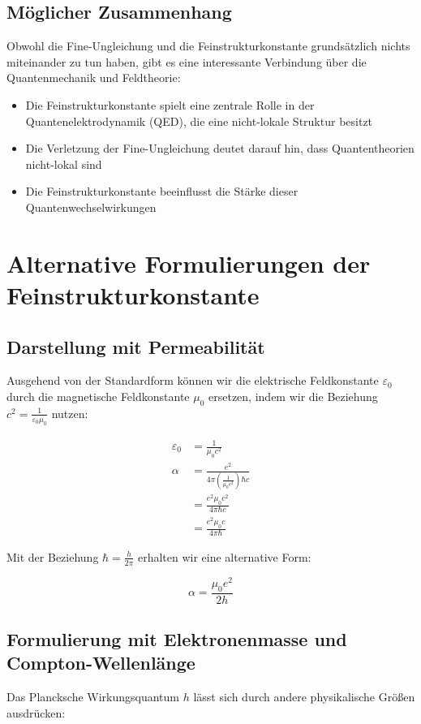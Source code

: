 \documentclass{article}
\begin{document}
	\subsection{Möglicher Zusammenhang}
	Obwohl die Fine-Ungleichung und die Feinstrukturkonstante grundsätzlich nichts miteinander zu tun haben, gibt es eine interessante Verbindung über die Quantenmechanik und Feldtheorie:
	
	\begin{itemize}
		\item Die Feinstrukturkonstante spielt eine zentrale Rolle in der Quantenelektrodynamik (QED), die eine nicht-lokale Struktur besitzt
		\item Die Verletzung der Fine-Ungleichung deutet darauf hin, dass Quantentheorien nicht-lokal sind
		\item Die Feinstrukturkonstante beeinflusst die Stärke dieser Quantenwechselwirkungen
	\end{itemize}
	
	\section{Alternative Formulierungen der Feinstrukturkonstante}
	
	\subsection{Darstellung mit Permeabilität}
	Ausgehend von der Standardform können wir die elektrische Feldkonstante $\varepsilon_0$ durch die magnetische Feldkonstante $\mu_0$ ersetzen, indem wir die Beziehung $c^2 = \frac{1}{\varepsilon_0\mu_0}$ nutzen:
	
	\begin{align}
		\varepsilon_0 &= \frac{1}{\mu_0c^2}\\
		\alpha &= \frac{e^2}{4\pi\left(\frac{1}{\mu_0c^2}\right)\hbar c}\\
		&= \frac{e^2\mu_0c^2}{4\pi\hbar c}\\
		&= \frac{e^2\mu_0c}{4\pi\hbar}
	\end{align}
	
	Mit der Beziehung $\hbar = \frac{h}{2\pi}$ erhalten wir eine alternative Form:
	
	\begin{equation}
		\alpha = \frac{\mu_0e^2}{2h}
	\end{equation}
	
	\subsection{Formulierung mit Elektronenmasse und Compton-Wellenlänge}
	Das Plancksche Wirkungsquantum $h$ lässt sich durch andere physikalische Größen ausdrücken:
	
\end{document}
